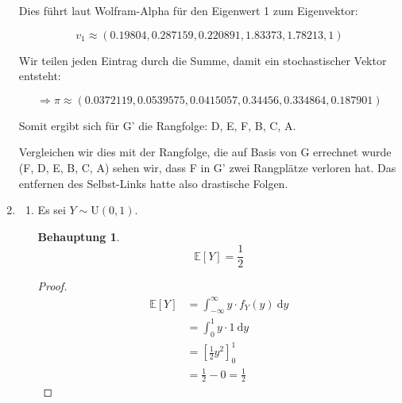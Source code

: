 \documentclass[a4paper]{scrartcl}
\newtheorem*{behaupt}{Behauptung}
\newcommand{\dif}{\ \mathrm{d}}
\newcommand{\e}{\mathbb{E}}
\def \blattnr {4}
\begin{document}
\begin{enumerate}[label=\bfseries \blattnr.\arabic*]
     Dies führt laut Wolfram-Alpha für den Eigenwert 1 zum Eigenvektor:
     
    \begin{equation*}
	v_1 \approx (0.19804, 0.287159, 0.220891, 1.83373, 1.78213, 1)
     \end{equation*}
     
     Wir teilen jeden Eintrag durch die Summe, damit ein stochastischer Vektor entsteht:
     
     \begin{equation*}
      \Rightarrow \pi \approx (0.0372119, 0.0539575, 0.0415057, 0.34456, 0.334864, 0.187901)
     \end{equation*}
     
     Somit ergibt sich für G' die Rangfolge: D, E, F, B, C, A. 
     
     Vergleichen wir dies mit der Rangfolge, die auf Basis von G errechnet wurde (F, D, E, B, C, A)
     sehen wir, dass F in G' zwei Rangplätze verloren hat. Das entfernen des Selbst-Links hatte also 
     drastische Folgen.
    
    \item
        \begin{enumerate}
            \item
                Es sei $Y \sim \text{U}(0,1)$.
                \begin{behaupt}
                    \begin{equation*}
                        \e[Y] = \frac{1}{2}
                    \end{equation*}
                \end{behaupt}
                \begin{proof}
                    \begin{equation*}
                        \begin{split}
                            \e[Y]
                            &= \int_{-\infty}^\infty y \cdot f_Y(y) \dif y \\
                            &= \int_0^1 y \cdot 1 \dif y \\
                            &= \left[ \frac{1}{2}y^2 \right]_0^1 \\
                            &= \frac{1}{2} - 0 = \frac{1}{2}
                        \end{split}
                    \end{equation*}
                \end{proof}


\end{enumerate}
\end{enumerate}
\end{document}
